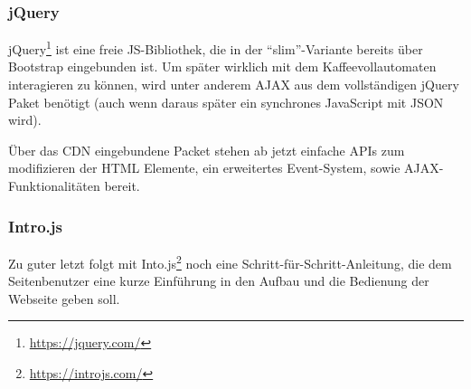 \subsubsection{jQuery}
jQuery\footnote{\url{https://jquery.com/}} ist eine freie \acl{JS}-Bibliothek, die in der "`slim"'-Variante bereits über Bootstrap eingebunden ist.
Um später wirklich mit dem Kaffeevollautomaten interagieren zu können, wird unter anderem \acs{AJAX} aus dem vollständigen jQuery Paket benötigt (auch wenn daraus später ein synchrones JavaScript mit \acs{JSON} wird).

Über das \acs{CDN} eingebundene Packet stehen ab jetzt einfache \aclp{API} zum modifizieren der \acs{HTML} Elemente, ein erweitertes Event-System, sowie \acs{AJAX}-Funktionalitäten bereit.

\subsubsection{Intro.js}
Zu guter letzt folgt mit Into.js\footnote{\url{https://introjs.com/}} noch eine Schritt-für-Schritt-Anleitung, die dem Seitenbenutzer eine kurze Einführung in den Aufbau und die Bedienung der Webseite geben soll.
